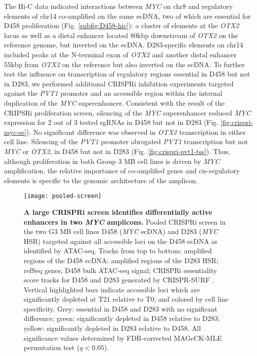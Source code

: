 The Hi-C data indicated interactions between \textit{MYC} on chr8 and regulatory elements of chr14 co-amplified on the same ecDNA, two of which are essential for D458 proliferation (Fig. \ref{subfig:D458-hic}): a cluster of elements at the \textit{OTX2} locus as well as a distal enhancer \cite{wortham_2014} located 80kbp downstream of \textit{OTX2} on the reference genome, but inverted on the ecDNA. D283-specific elements on chr14 included peaks at the N-terminal exon of \textit{OTX2} and another distal enhancer \cite{wortham_2014} 55kbp from \textit{OTX2} on the reference but also inverted on the ecDNA. To further test the influence on transcription of regulatory regions essential in D458 but not in D283, we performed additional CRISPRi inhibition experiments targeted against the \textit{PVT1} promoter and an accessible region within the internal duplication of the \textit{MYC} superenhancer. Consistent with the result of the CRIPSRi proliferation screen, silencing of the \textit{MYC} superenhancer reduced \textit{MYC} expression for 2 out of 3 tested sgRNAs in D458 but not in D283 (Fig. \ref{fig:crispri-myc-se}). No significant difference was observed in \textit{OTX2} transcription in either cell line. Silencing of the \textit{PVT1} promoter abrogated \textit{PVT1} transcription but not \textit{MYC} or \textit{OTX2}, in D458 but not in D283 (Fig. \ref{fig:crispri-pvt1-tss}). Thus, although proliferation in both Group 3 MB cell lines is driven by \textit{MYC} amplification, the relative importance of co-amplified genes and cis-regulatory elements is specific to the genomic architecture of the amplicon.

\begin{figure}[!h]
    \centering
    \centerline{%
    \texttt{[image: pooled-screen]}%
    }
    \caption[A large CRISPRi screen identifies differentially active enhancers in two \textit{MYC} amplicons.]{\textbf{A large CRISPRi screen identifies differentially active enhancers in two \textit{MYC} amplicons.} Pooled CRISPRi screen in the two G3 MB cell lines D458 (\textit{MYC} ecDNA) and D283 (\textit{MYC} HSR) targeted against all accessible loci on the D458 ecDNA as identified by ATAC-seq. Tracks from top to bottom: amplified regions of the D458 ecDNA; amplified regions of the D283 HSR; refSeq genes; D458 bulk ATAC-seq signal; CRISPRi essentiality score tracks for D458 and D283 generated by CRISPR-SURF \cite{crispr-surf}. Vertical highlighted bars indicate accessible loci which are significantly depleted at T21 relative to T0, and colored by cell line specificity. Grey: essential in D458 and D283 with no significant difference; green: significantly depleted in D458 relative to D283; yellow: significantly depleted in D283 relative to D458. All significance values determined by FDR-corrected MAGeCK-MLE permutation test \cite{mageck} ($q < 0.05$).}
    \label{fig:crispri-pooled}
\end{figure}

